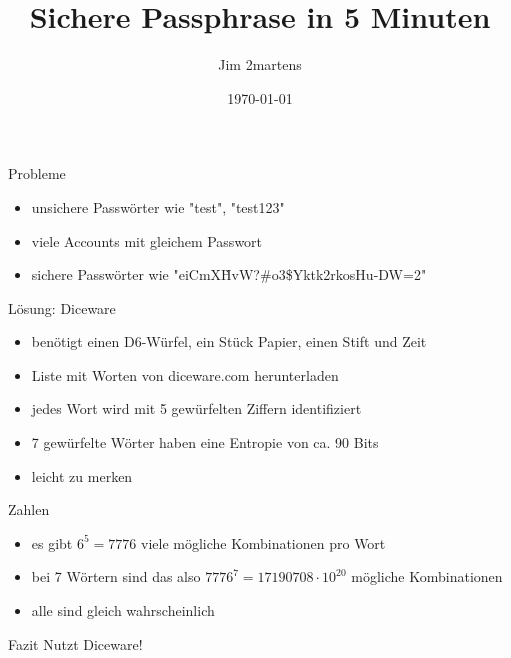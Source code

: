 \documentclass{beamer}
\begin{document}
\author{Jim 2martens}
\title{Sichere Passphrase in 5 Minuten}
\date{\today}

\begin{frame}
    \titlepage
\end{frame}

\begin{frame}{Probleme}
    \begin{itemize}
        \item unsichere Passwörter wie "test", "test123"
        \vfill
        \item<2-> viele Accounts mit gleichem Passwort
        \vfill
        \item<3-> sichere Passwörter wie "eiCmX\`HvW?\#o3\$Yktk2rkosHu-DW=2"
    \end{itemize}
\end{frame}

\begin{frame}{Lösung: Diceware}
    \begin{itemize}
        \item benötigt einen D6-Würfel, ein Stück Papier, einen Stift und Zeit
        \vfill
        \item Liste mit Worten von diceware.com herunterladen
        \vfill
        \item jedes Wort wird mit 5 gewürfelten Ziffern identifiziert
        \vfill
        \item 7 gewürfelte Wörter haben eine Entropie von ca. 90 Bits
        \vfill
        \item leicht zu merken
    \end{itemize}
\end{frame}

\begin{frame}{Zahlen}
    \begin{itemize}
        \item es gibt \(6^5=7776\) viele mögliche Kombinationen pro Wort
        \vfill
        \item bei 7 Wörtern sind das also \(7776^7=17190708 \cdot 10^{20}\) mögliche Kombinationen
        \vfill
        \item alle sind gleich wahrscheinlich
    \end{itemize}
\end{frame}

\begin{frame}{Fazit}
    \centering
    Nutzt Diceware!
\end{frame}
\end{document}
